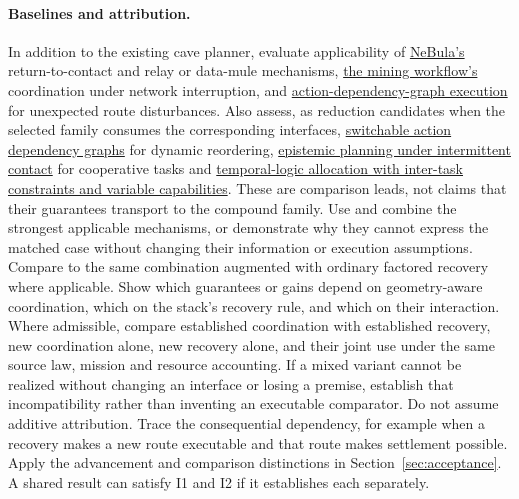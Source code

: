 \documentclass[11pt]{article}
\begin{document}
\paragraph{Baselines and attribution.} In addition to the existing cave planner, evaluate applicability of \href{https://arxiv.org/html/2103.11470}{NeBula's} return-to-contact and relay or data-mule mechanisms, \href{https://doi.org/10.3390/app16031212}{the mining workflow's} coordination under network interruption, and \href{https://whoenig.github.io/publications/2019_RA-L_Hoenig.pdf}{action-dependency-graph execution} for unexpected route disturbances. Also assess, as reduction candidates when the selected family consumes the corresponding interfaces, \href{https://doi.org/10.1109/TRO.2023.3344051}{switchable action dependency graphs} for dynamic reordering, \href{https://pmc.ncbi.nlm.nih.gov/articles/PMC10243298/}{epistemic planning under intermittent contact} for cooperative tasks and \href{https://doi.org/10.1109/TASE.2025.3558977}{temporal-logic allocation with inter-task constraints and variable capabilities}. These are comparison leads, not claims that their guarantees transport to the compound family. Use and combine the strongest applicable mechanisms, or demonstrate why they cannot express the matched case without changing their information or execution assumptions. Compare to the same combination augmented with ordinary factored recovery where applicable. Show which guarantees or gains depend on geometry-aware coordination, which on the stack's recovery rule, and which on their interaction. Where admissible, compare established coordination with established recovery, new coordination alone, new recovery alone, and their joint use under the same source law, mission and resource accounting. If a mixed variant cannot be realized without changing an interface or losing a premise, establish that incompatibility rather than inventing an executable comparator. Do not assume additive attribution. Trace the consequential dependency, for example when a recovery makes a new route executable and that route makes settlement possible. Apply the advancement and comparison distinctions in Section~\ref{sec:acceptance}. A shared result can satisfy I1 and I2 if it establishes each separately.
\end{document}
